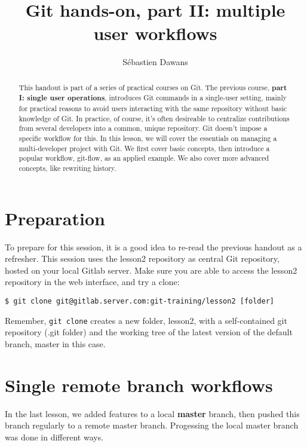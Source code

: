 \documentclass{../common/tufte-latex/tufte-handout}
\title{Git hands-on, part II: multiple user workflows}
\author{S\'ebastien Dawans}
\begin{document}
\maketitle%

\begin{abstract}
\noindent
This handout is part of a series of practical courses on Git.
The previous course, \textbf{part I: single user operations}, introduces Git commands in a single-user setting, mainly for practical reasons to avoid users interacting with the same repository without basic knowledge of Git.
In practice, of course, it's often desireable to centralize contributions from several developers into a common, unique repository.
Git doesn't impose a specific workflow for this. 
In this lesson, we will cover the essentials on managing a multi-developer project with Git.
We first cover basic concepts, then introduce a popular workflow, git-flow, as an applied example.
We also cover more advanced concepts, like rewriting history.
\end{abstract}

\section{Preparation}

To prepare for this session, it is a good idea to re-read the previous handout as a refresher.
This session uses the lesson2 repository as central Git repository, hosted on your local Gitlab server.
Make sure you are able to access the lesson2 repository in the web interface, and try a clone:

\begin{lstlisting}[style=BashInputStyle]
  $ git clone git@gitlab.server.com:git-training/lesson2 [folder]
\end{lstlisting}

Remember, \texttt{git clone} creates a new folder, lesson2, with a self-contained git repository (.git folder) and the working tree of the latest version of the default branch, master in this case.

\section{Single remote branch workflows}

In the last lesson, we added features to a local \textbf{master} branch, then pushed this branch regularly to a remote master branch.
Progessing the local master branch was done in different ways.
\end{document}
